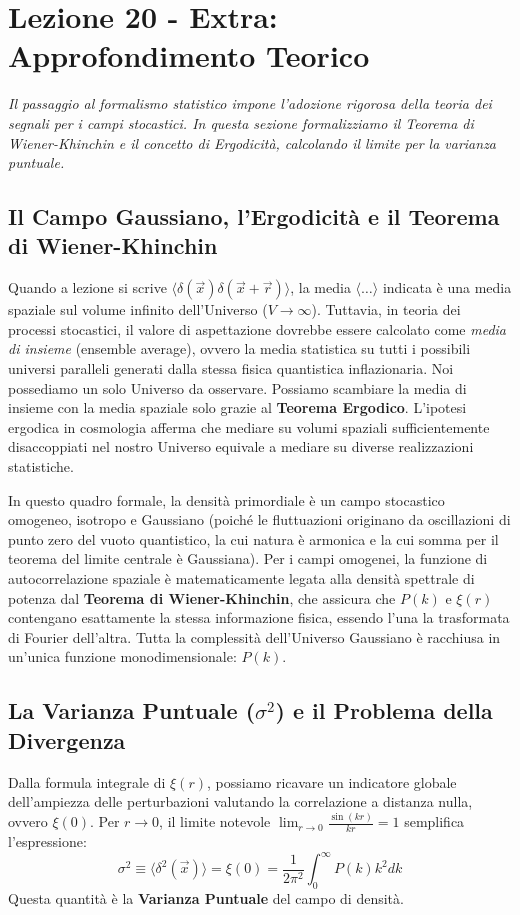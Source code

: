 \documentclass[11pt,a4paper]{report}
\begin{document}
\newpage
\section{Lezione 20 - Extra: Approfondimento Teorico}

\textit{Il passaggio al formalismo statistico impone l'adozione rigorosa della teoria dei segnali per i campi stocastici. In questa sezione formalizziamo il Teorema di Wiener-Khinchin e il concetto di Ergodicità, calcolando il limite per la varianza puntuale.}

\subsection{Il Campo Gaussiano, l'Ergodicità e il Teorema di Wiener-Khinchin}
Quando a lezione si scrive $\langle \delta(\vec{x}) \delta(\vec{x} + \vec{r}) \rangle$, la media $\langle \dots \rangle$ indicata è una media spaziale sul volume infinito dell'Universo ($V \to \infty$). 
Tuttavia, in teoria dei processi stocastici, il valore di aspettazione dovrebbe essere calcolato come \textit{media di insieme} (ensemble average), ovvero la media statistica su tutti i possibili universi paralleli generati dalla stessa fisica quantistica inflazionaria. 
Noi possediamo un solo Universo da osservare. Possiamo scambiare la media di insieme con la media spaziale solo grazie al \textbf{Teorema Ergodico}. L'ipotesi ergodica in cosmologia afferma che mediare su volumi spaziali sufficientemente disaccoppiati nel nostro Universo equivale a mediare su diverse realizzazioni statistiche.

In questo quadro formale, la densità primordiale è un campo stocastico omogeneo, isotropo e Gaussiano (poiché le fluttuazioni originano da oscillazioni di punto zero del vuoto quantistico, la cui natura è armonica e la cui somma per il teorema del limite centrale è Gaussiana).
Per i campi omogenei, la funzione di autocorrelazione spaziale è matematicamente legata alla densità spettrale di potenza dal \textbf{Teorema di Wiener-Khinchin}, che assicura che $P(k)$ e $\xi(r)$ contengano esattamente la stessa informazione fisica, essendo l'una la trasformata di Fourier dell'altra. Tutta la complessità dell'Universo Gaussiano è racchiusa in un'unica funzione monodimensionale: $P(k)$.

\subsection{La Varianza Puntuale ($\sigma^2$) e il Problema della Divergenza}
Dalla formula integrale di $\xi(r)$, possiamo ricavare un indicatore globale dell'ampiezza delle perturbazioni valutando la correlazione a distanza nulla, ovvero $\xi(0)$. 
Per $r \to 0$, il limite notevole $\lim_{r\to0} \frac{\sin(kr)}{kr} = 1$ semplifica l'espressione:
\begin{equation}
\sigma^2 \equiv \langle \delta^2(\vec{x}) \rangle = \xi(0) = \frac{1}{2\pi^2} \int_0^\infty P(k) k^2 dk
\end{equation}
Questa quantità è la \textbf{Varianza Puntuale} del campo di densità. 
\end{document}
